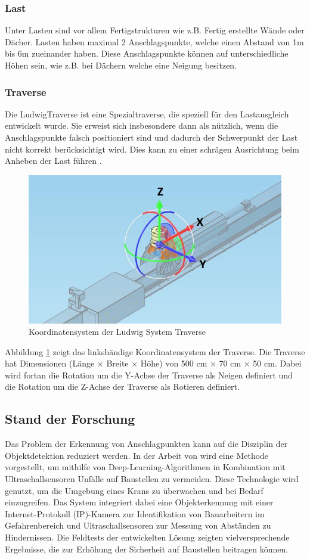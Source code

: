 \subsubsection{Last}
Unter Lasten sind vor allem Fertigstrukturen wie z.B. Fertig erstellte Wände oder Dächer. 
Lasten haben maximal 2 Anschlagspunkte, welche einen Abstand von 1m bis 6m zueinander haben.
Diese Anschlagspunkte können auf unterschiedliche Höhen sein, wie z.B. bei Dächern welche eine
Neigung besitzen.

\clearpage
\subsubsection{Traverse}
Die LudwigTraverse ist eine Spezialtraverse, die speziell für den Lastausgleich entwickelt 
wurde. Sie erweist sich insbesondere dann als nützlich, wenn die Anschlagspunkte 
falsch positioniert sind und dadurch der Schwerpunkt der Last nicht korrekt berücksichtigt wird. 
Dies kann zu einer schrägen Ausrichtung beim Anheben der Last führen \cite{ludwigTraverse}.

\begin{figure}[H]
    \centering
    \includegraphics[width=0.5\linewidth]{graphics/Traverse_Rotationen.PNG}
    \caption{Koordinatensystem der Ludwig System Traverse}
    \label{fig:traverse}
\end{figure}

Abbildung \ref{fig:traverse} zeigt das linkshändige Koordinatensystem der Traverse.
Die Traverse hat Dimensionen (Länge × Breite × Höhe) von 500 cm × 70 cm × 50 cm.
Dabei wird fortan die Rotation um die Y-Achse der Traverse als Neigen definiert und die Rotation 
um die Z-Achse der Traverse als Rotieren definiert.

\subsection{Stand der Forschung}
Das Problem der Erkennung von Anschlagpunkten kann auf die Disziplin der Objektdetektion reduziert werden.
In der Arbeit von \cite{yong_object_2023} wird eine Methode vorgestellt, um mithilfe von Deep-Learning-Algorithmen 
in Kombination mit Ultraschallsensoren Unfälle auf Baustellen zu vermeiden. Diese Technologie wird genutzt, um die
Umgebung eines Krans zu überwachen und bei Bedarf einzugreifen. Das System integriert dabei eine Objekterkennung mit
einer Internet-Protokoll (IP)-Kamera zur Identifikation von Bauarbeitern im Gefahrenbereich und Ultraschallsensoren zur 
Messung von Abständen zu Hindernissen. Die Feldtests der entwickelten Lösung zeigten vielversprechende Ergebnisse, die 
zur Erhöhung der Sicherheit auf Baustellen beitragen können.


